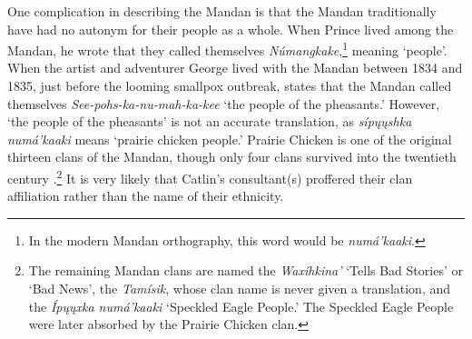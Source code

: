 One complication in describing the Mandan is that the Mandan traditionally have had no autonym for their people as a whole. When Prince \citet{maximilian1839} lived among the Mandan, he wrote that they called themselves \textit{Númangkake},\footnote{In the modern Mandan orthography, this word would be \textit{numá'kaaki}.} meaning `people'. When the artist and adventurer George \citet[260]{catlin1844} lived with the Mandan between 1834 and 1835, just before the looming smallpox outbreak, \citeauthor{catlin1844} states that the Mandan called themselves \textit{See-pohs-ka-nu-mah-ka-kee} `the people of the pheasants.' However, `the people of the pheasants' is not an accurate translation, as \textit{sípųųshka numá'kaaki} means `prairie chicken people.' Prairie Chicken is one of the original thirteen clans of the Mandan, though only four clans survived into the twentieth century \citep[30]{bowers1950}.\footnote{The remaining Mandan clans are named the \textit{Waxíhkina'} `Tells Bad Stories' or `Bad News', the \textit{Tamísik}, whose clan name is never given a translation, and the \textit{Ípųųxka numá'kaaki} `Speckled Eagle People.' The Speckled Eagle People were later absorbed by the Prairie Chicken clan.} It is very likely that Catlin's consultant(s) proffered their clan affiliation rather than the name of their ethnicity.

